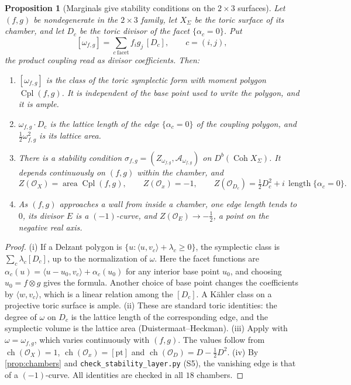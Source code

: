 \documentclass[11pt]{article}
\newtheorem{proposition}[theorem]{Proposition}
\theoremstyle{definition}
\theoremstyle{remark}
\newcommand{\Cpl}{\operatorname{Cpl}}
\begin{document}
\begin{proposition}[Marginals give stability conditions on the $2\times3$ surfaces]\label{prop:stab}
Let $(f,g)$ be nondegenerate in the $2\times3$ family, let $X_\Sigma$ be the toric surface of its
chamber, and let $D_c$ be the toric divisor of the facet $\{\alpha_c=0\}$. Put
\[
[\omega_{f,g}]=\sum_{c\ \mathrm{facet}}f_ig_j\,[D_c],\qquad c=(i,j),
\]
the product coupling read as divisor coefficients. Then:
\begin{enumerate}[label=(\roman*)]
\item $[\omega_{f,g}]$ is the class of the toric symplectic form with moment polygon $\Cpl(f,g)$. It is
  independent of the base point used to write the polygon, and it is ample.
\item $\omega_{f,g}\cdot D_c$ is the lattice length of the edge $\{\alpha_c=0\}$ of the coupling polygon,
  and $\tfrac12\omega_{f,g}^2$ is its lattice area.
\item There is a stability condition $\sigma_{f,g}=(Z_{\omega_{f,g}},\mathcal A_{\omega_{f,g}})$ on
  $D^b(\operatorname{Coh}X_\Sigma)$. It depends continuously on $(f,g)$ within the chamber, and
  \[
  Z(\mathcal O_X)=\operatorname{area}\Cpl(f,g),\qquad Z(\mathcal O_x)=-1,\qquad
  Z(\mathcal O_{D_c})=\tfrac12D_c^2+i\,\operatorname{length}\{\alpha_c=0\}.
  \]
\item As $(f,g)$ approaches a wall from inside a chamber, one edge length tends to $0$, its divisor
  $E$ is a $(-1)$-curve, and $Z(\mathcal O_E)\to-\tfrac12$, a point on the negative real axis.
\end{enumerate}
\end{proposition}
\begin{proof}
(i) If a Delzant polygon is $\{u:\langle u,v_c\rangle+\lambda_c\ge0\}$, the symplectic class is
$\sum_c\lambda_c[D_c]$, up to the normalization of $\omega$. Here the facet functions are
$\alpha_c(u)=\langle u-u_0,v_c\rangle+\alpha_c(u_0)$ for any interior base point $u_0$, and choosing
$u_0=f\otimes g$ gives the formula. Another choice of base point changes the coefficients by
$\langle w,v_c\rangle$, which is a linear relation among the $[D_c]$. A Kähler class on a projective
toric surface is ample. (ii) These are standard toric identities: the degree of $\omega$ on $D_c$ is
the lattice length of the corresponding edge, and the symplectic volume is the lattice area
(Duistermaat--Heckman). (iii) Apply \cite{ArcaraBertram2013,MacriSchmidt2017} with $\omega=\omega_{f,g}$,
which varies continuously with $(f,g)$. The values follow from $\operatorname{ch}(\mathcal O_X)=1$,
$\operatorname{ch}(\mathcal O_x)=[\mathrm{pt}]$ and $\operatorname{ch}(\mathcal O_D)=D-\tfrac12D^2$. (iv) By
\cref{prop:chambers} and \texttt{check\_stability\_layer.py} (S5), the vanishing edge is that of a
$(-1)$-curve. All identities are checked in all $18$ chambers.
\end{proof}
\end{document}

